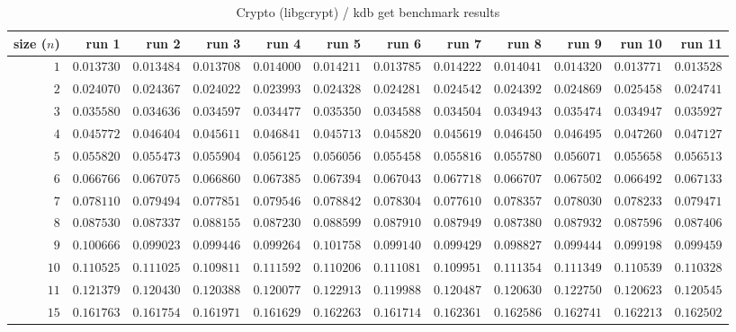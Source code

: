  
\begin{sidewaystable} \centering \caption{Crypto (libgcrypt) / kdb get benchmark results} \label{eval-table-libgcrypt-get} \scriptsize \begin{tabular}{r|rrrrrrrrrrr} size ($n$) & run 1 & run 2 & run 3 & run 4 & run 5 & run 6 & run 7 & run 8 & run 9 & run 10 & run 11\\ \hline
$1$ & $0.013730$ & $0.013484$ & $0.013708$ & $0.014000$ & $0.014211$ & $0.013785$ & $0.014222$ & $0.014041$ & $0.014320$ & $0.013771$ & $0.013528$ \\
$2$ & $0.024070$ & $0.024367$ & $0.024022$ & $0.023993$ & $0.024328$ & $0.024281$ & $0.024542$ & $0.024392$ & $0.024869$ & $0.025458$ & $0.024741$ \\
$3$ & $0.035580$ & $0.034636$ & $0.034597$ & $0.034477$ & $0.035350$ & $0.034588$ & $0.034504$ & $0.034943$ & $0.035474$ & $0.034947$ & $0.035927$ \\
$4$ & $0.045772$ & $0.046404$ & $0.045611$ & $0.046841$ & $0.045713$ & $0.045820$ & $0.045619$ & $0.046450$ & $0.046495$ & $0.047260$ & $0.047127$ \\
$5$ & $0.055820$ & $0.055473$ & $0.055904$ & $0.056125$ & $0.056056$ & $0.055458$ & $0.055816$ & $0.055780$ & $0.056071$ & $0.055658$ & $0.056513$ \\
$6$ & $0.066766$ & $0.067075$ & $0.066860$ & $0.067385$ & $0.067394$ & $0.067043$ & $0.067718$ & $0.066707$ & $0.067502$ & $0.066492$ & $0.067133$ \\
$7$ & $0.078110$ & $0.079494$ & $0.077851$ & $0.079546$ & $0.078842$ & $0.078304$ & $0.077610$ & $0.078357$ & $0.078030$ & $0.078233$ & $0.079471$ \\
$8$ & $0.087530$ & $0.087337$ & $0.088155$ & $0.087230$ & $0.088599$ & $0.087910$ & $0.087949$ & $0.087380$ & $0.087932$ & $0.087596$ & $0.087406$ \\
$9$ & $0.100666$ & $0.099023$ & $0.099446$ & $0.099264$ & $0.101758$ & $0.099140$ & $0.099429$ & $0.098827$ & $0.099444$ & $0.099198$ & $0.099459$ \\
$10$ & $0.110525$ & $0.111025$ & $0.109811$ & $0.111592$ & $0.110206$ & $0.111081$ & $0.109951$ & $0.111354$ & $0.111349$ & $0.110539$ & $0.110328$ \\
$11$ & $0.121379$ & $0.120430$ & $0.120388$ & $0.120077$ & $0.122913$ & $0.119988$ & $0.120487$ & $0.120630$ & $0.122750$ & $0.120623$ & $0.120545$ \\
$15$ & $0.161763$ & $0.161754$ & $0.161971$ & $0.161629$ & $0.162263$ & $0.161714$ & $0.162361$ & $0.162586$ & $0.162741$ & $0.162213$ & $0.162502$ \\

\end{tabular}
\end{sidewaystable}
